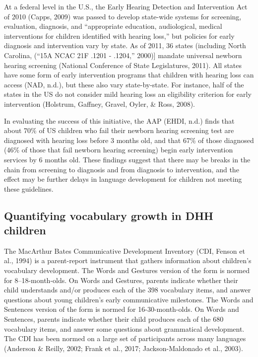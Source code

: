 \documentclass[english,man]{apa6}
\begin{document}
At a federal level in the U.S., the Early Hearing Detection and Intervention Act of 2010 (Capps, 2009) was passed to develop state-wide systems for screening, evaluation, diagnosis, and \enquote{appropriate education, audiological, medical interventions for children identified with hearing loss,} but policies for early diagnosis and intervention vary by state. As of 2011, 36 states (including North Carolina, (``15A NCAC 21F .1201 - .1204,'' 2000){]} mandate universal newborn hearing screening (National Conference of State Legislatures, 2011). All states have some form of early intervention programs that children with hearing loss can access (NAD, n.d.), but these also vary state-by-state. For instance, half of the states in the US do not consider mild hearing loss an eligibility criterion for early intervention (Holstrum, Gaffney, Gravel, Oyler, \& Ross, 2008).

In evaluating the success of this initiative, the AAP (EHDI, n.d.) finds that about 70\% of US children who fail their newborn hearing screening test are diagnosed with hearing loss before 3 months old, and that 67\% of those diagnosed (46\% of those that fail newborn hearing screening) begin early intervention services by 6 months old. These findings suggest that there may be breaks in the chain from screening to diagnosis and from diagnosis to intervention, and the effect may be further delays in language development for children not meeting these guidelines.

\hypertarget{quantifying-vocabulary-growth-in-dhh-children}{%
\subsection{Quantifying vocabulary growth in DHH children}\label{quantifying-vocabulary-growth-in-dhh-children}}

The MacArthur Bates Communicative Development Inventory (CDI, Fenson et al., 1994) is a parent-report instrument that gathers information about children's vocabulary development. The Words and Gestures version of the form is normed for 8--18-month-olds. On Words and Gestures, parents indicate whether their child understands and/or produces each of the 398 vocabulary items, and answer questions about young children's early communicative milestones. The Words and Sentences version of the form is normed for 16-30-month-olds. On Words and Sentences, parents indicate whether their child produces each of the 680 vocabulary items, and answer some questions about grammatical development. The CDI has been normed on a large set of participants across many languages (Anderson \& Reilly, 2002; Frank et al., 2017; Jackson-Maldonado et al., 2003).
\end{document}
